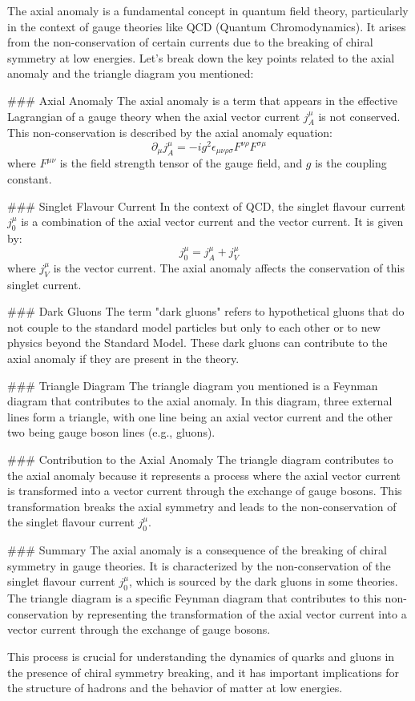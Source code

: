 The axial anomaly is a fundamental concept in quantum field theory, particularly in the context of gauge theories like QCD (Quantum Chromodynamics). It arises from the non-conservation of certain currents due to the breaking of chiral symmetry at low energies. Let's break down the key points related to the axial anomaly and the triangle diagram you mentioned:

### Axial Anomaly
The axial anomaly is a term that appears in the effective Lagrangian of a gauge theory when the axial vector current \( j_A^\mu \) is not conserved. This non-conservation is described by the axial anomaly equation:
\[
\partial_\mu j_A^\mu = -i g^2 \epsilon_{\mu\nu\rho\sigma} F^{\nu\rho} F^{\sigma\mu}
\]
where \( F^{\mu\nu} \) is the field strength tensor of the gauge field, and \( g \) is the coupling constant.

### Singlet Flavour Current
In the context of QCD, the singlet flavour current \( j_0^\mu \) is a combination of the axial vector current and the vector current. It is given by:
\[
j_0^\mu = j_A^\mu + j_V^\mu
\]
where \( j_V^\mu \) is the vector current. The axial anomaly affects the conservation of this singlet current.

### Dark Gluons
The term "dark gluons" refers to hypothetical gluons that do not couple to the standard model particles but only to each other or to new physics beyond the Standard Model. These dark gluons can contribute to the axial anomaly if they are present in the theory.

### Triangle Diagram
The triangle diagram you mentioned is a Feynman diagram that contributes to the axial anomaly. In this diagram, three external lines form a triangle, with one line being an axial vector current and the other two being gauge boson lines (e.g., gluons).

### Contribution to the Axial Anomaly
The triangle diagram contributes to the axial anomaly because it represents a process where the axial vector current is transformed into a vector current through the exchange of gauge bosons. This transformation breaks the axial symmetry and leads to the non-conservation of the singlet flavour current \( j_0^\mu \).

### Summary
The axial anomaly is a consequence of the breaking of chiral symmetry in gauge theories. It is characterized by the non-conservation of the singlet flavour current \( j_0^\mu \), which is sourced by the dark gluons in some theories. The triangle diagram is a specific Feynman diagram that contributes to this non-conservation by representing the transformation of the axial vector current into a vector current through the exchange of gauge bosons.

This process is crucial for understanding the dynamics of quarks and gluons in the presence of chiral symmetry breaking, and it has important implications for the structure of hadrons and the behavior of matter at low energies.